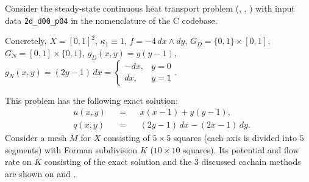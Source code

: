 \begin{example}
  \label{cmc/diffusion/continuous/steady_state/examples/2d_d00_p04-example}
  Consider the steady-state continuous heat transport problem
  (,
   ,
   )
  with input data \verb|2d_d00_p04| in the nomenclature of the C codebase.

  Concretely,
    $X = [0, 1]^2$,
    $\kappa_1 \equiv 1$,
    $f = - 4 \, d x \wedge d y$,
    $G_D = \{0, 1\} \times [0, 1]$,
    $G_N = [0, 1] \times \{0, 1\}$,
    $g_D(x, y) = y (y - 1)$,
    $g_N(x, y) = (2 y - 1) \, d x =
      \begin{cases}
        - d x, & y = 0 \\
          d x, & y = 1
      \end{cases}
    $.

  This problem has the following exact solution:
  \begin{subequations}
    \begin{alignat}{3}
      & u(x, y) && = && x (x - 1) + y (y - 1), \\
      & q(x, y) && = && (2 y - 1)\, d x - (2 x - 1)\, d y.
    \end{alignat}
  \end{subequations}
  Consider a mesh $M$ for $X$ consisting of $5 \times 5$ squares (each axis is
  divided into $5$ segments) with Forman subdivision $K$
  ($10 \times 10$ squares).
  Its potential and flow rate on $K$ consisting of the exact solution and the
  $3$ discussed cochain methods are shown on
  and
  .
\end{example}
